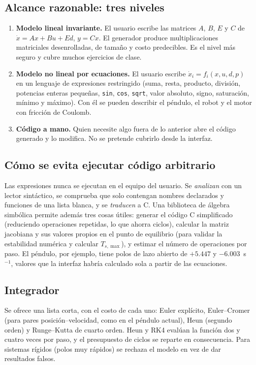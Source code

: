 \documentclass[12pt,letterpaper]{article}
\begin{document}
\subsection{Alcance razonable: tres niveles}

\begin{enumerate}
    \item \textbf{Modelo lineal invariante.} El usuario escribe las matrices $A$, $B$, $E$ y $C$ de $\dot{x}=Ax+Bu+Ed$, $y=Cx$. El generador produce multiplicaciones matriciales desenrolladas, de tamaño y costo predecibles. Es el nivel más seguro y cubre muchos ejercicios de clase.
    \item \textbf{Modelo no lineal por ecuaciones.} El usuario escribe $\dot{x}_i=f_i(x,u,d,p)$ en un lenguaje de expresiones restringido (suma, resta, producto, división, potencias enteras pequeñas, \texttt{sin}, \texttt{cos}, \texttt{sqrt}, valor absoluto, signo, saturación, mínimo y máximo). Con él se pueden describir el péndulo, el robot y el motor con fricción de Coulomb.
    \item \textbf{Código a mano.} Quien necesite algo fuera de lo anterior abre el código generado y lo modifica. No se pretende cubrirlo desde la interfaz.
\end{enumerate}

\subsection{Cómo se evita ejecutar código arbitrario}

Las expresiones nunca se ejecutan en el equipo del usuario. Se \emph{analizan} con un lector sintáctico, se comprueba que solo contengan nombres declarados y funciones de una lista blanca, y se \emph{traducen} a C. Una biblioteca de álgebra simbólica permite además tres cosas útiles: generar el código C simplificado (reduciendo operaciones repetidas, lo que ahorra ciclos), calcular la matriz jacobiana y sus valores propios en el punto de equilibrio (para validar la estabilidad numérica y calcular $T_{s,\max}$), y estimar el número de operaciones por paso. El péndulo, por ejemplo, tiene polos de lazo abierto de $+5.447$ y $-6.003$~s$^{-1}$, valores que la interfaz habría calculado sola a partir de las ecuaciones.

\subsection{Integrador}

Se ofrece una lista corta, con el costo de cada uno: Euler explícito, Euler--Cromer (para pares posición--velocidad, como en el péndulo actual), Heun (segundo orden) y Runge--Kutta de cuarto orden. Heun y RK4 evalúan la función dos y cuatro veces por paso, y el presupuesto de ciclos se reparte en consecuencia. Para sistemas rígidos (polos muy rápidos) se rechaza el modelo en vez de dar resultados falsos.
\end{document}
